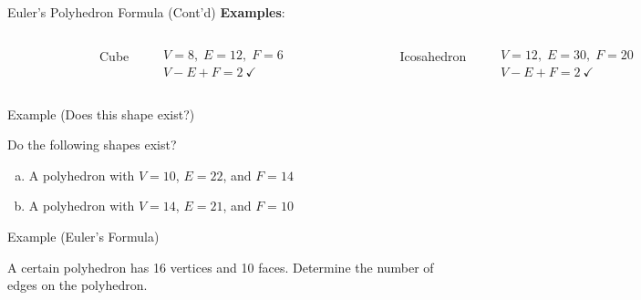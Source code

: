 \begin{frame}{Euler's Polyhedron Formula (Cont'd)}
    \textbf{Examples}:
    \begin{columns}
    \begin{figure}[H]
        \centering
        
    \end{figure}
    \begin{center}
        Cube
    \end{center}
    \begin{align*}
        & V=8,\; E=12,\; F=6
        \\
        &V-E+F = 2\ \checkmark
    \end{align*}   
    \begin{figure}[H]
        \centering
        
    \end{figure}   
    \begin{center}
        Icosahedron 
    \end{center}
    \begin{align*}
        & V=12,\; E=30,\; F=20
        \\
        &V-E+F = 2\ \checkmark
    \end{align*}   
    \end{columns}
\end{frame}
\begin{frame}[t]{Example (Does this shape exist?)}
    \begin{example}
        Do the following shapes exist?
        \begin{enumerate}[(a)]
            \item A polyhedron with $V=10$, $E=22$, and $F=14$
            \item A polyhedron with $V= 14$, $E=21$, and $F= 10$
        \end{enumerate}
    \end{example}
\end{frame}
\begin{frame}[t]{Example (Euler's Formula)}
    \begin{example}
        A certain polyhedron has 16 vertices and 10 faces. Determine the number of edges on the polyhedron.
    \end{example}
\end{frame}
